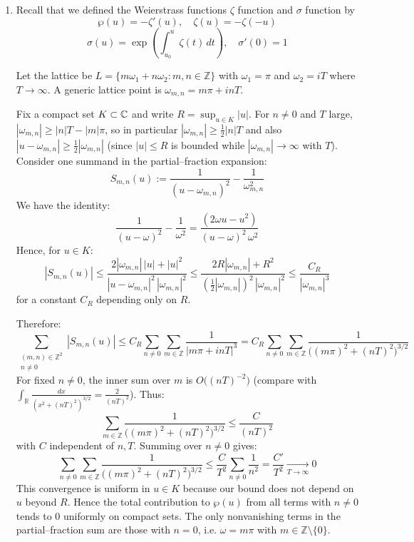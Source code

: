 \documentclass[12pt]{article}  %
\begin{document}
\begin{solution}
  \begin{enumerate}
    \item Recall that we defined the Weierstrass functions $\zeta$ function and $\sigma$ function by
  \[\wp(u)=-\zeta'(u), \quad \zeta(u)=-\zeta(-u)\]
  \[\sigma(u) = \exp\left(\int_{u_0}^u \zeta(t)\,dt\right), \quad \sigma'(0) = 1\]

Let the lattice be $L=\{m\omega_1+n\omega_2:m,n\in\mathbb Z\}$ with $\omega_1=\pi$ and $\omega_2=iT$ where $T\to\infty$. A generic lattice point is $\omega_{m,n}=m\pi+i nT$.

Fix a compact set $K\subset\mathbb{C}$ and write $R=\sup_{u\in K}|u|$.
For $n\neq 0$ and $T$ large, $|\omega_{m,n}|\ge |n|T-|m|\pi$, so in particular $|\omega_{m,n}| \ge \tfrac12 |n|T$ and also $|u-\omega_{m,n}|\ge \tfrac12|\omega_{m,n}|$ (since $|u|\le R$ is bounded while $|\omega_{m,n}|\to\infty$ with $T$). Consider one summand in the partial–fraction expansion:
\[
S_{m,n}(u) := \frac{1}{(u-\omega_{m,n})^2}-\frac{1}{\omega_{m,n}^2}
\]
We have the identity:
\[
\frac{1}{(u-\omega)^2}-\frac{1}{\omega^2} = \frac{(2\omega u-u^2)}{(u-\omega)^2\,\omega^2}
\]
Hence, for $u\in K$:
\[
|S_{m,n}(u)| \le \frac{2|\omega_{m,n}|\,|u|+|u|^2}{|u-\omega_{m,n}|^2\,|\omega_{m,n}|^2} \le \frac{2R|\omega_{m,n}|+R^2}{(\tfrac12|\omega_{m,n}|)^2\,|\omega_{m,n}|^2} \le \frac{C_R}{|\omega_{m,n}|^3}
\]
for a constant $C_R$ depending only on $R$.

Therefore:
\[
\sum_{\substack{(m,n)\in\mathbb Z^2\\ n\ne 0}} |S_{m,n}(u)| \le C_R \sum_{n\ne 0}\sum_{m\in\mathbb Z}\frac{1}{|m\pi+inT|^3} = C_R \sum_{n\ne 0}\sum_{m\in\mathbb Z}\frac{1}{\big((m\pi)^2+(nT)^2\big)^{3/2}}
\]
For fixed $n\neq 0$, the inner sum over $m$ is $O\big((nT)^{-2}\big)$ (compare with $\int_{\mathbb R}\frac{dx}{(x^2+(nT)^2)^{3/2}}=\frac{2}{(nT)^2}$). Thus:
\[
\sum_{m\in\mathbb Z}\frac{1}{\big((m\pi)^2+(nT)^2\big)^{3/2}} \le \frac{C}{(nT)^2}
\]
with $C$ independent of $n,T$. Summing over $n\neq 0$ gives:
\[
\sum_{n\ne 0}\sum_{m\in\mathbb Z}\frac{1}{\big((m\pi)^2+(nT)^2\big)^{3/2}} \le \frac{C}{T^2}\sum_{n\ne 0}\frac{1}{n^2} = \frac{C'}{T^2} \xrightarrow[T\to\infty]{} 0
\]
This convergence is uniform in $u\in K$ because our bound does not depend on $u$ beyond $R$. Hence the total contribution to $\wp(u)$ from all terms with $n\neq 0$ tends to 0 uniformly on compact sets. The only nonvanishing terms in the partial–fraction sum are those with $n=0$, i.e. $\omega=m\pi$ with $m\in\mathbb Z\setminus\{0\}$. 


\end{enumerate}
\end{solution}
\end{document}
